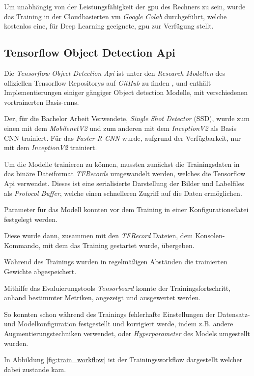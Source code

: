 Um unabhängig von der Leistungsfähigkeit der \Gls{gpu} des 
Rechners zu sein, wurde das Training in der Cloudbasierten
\Gls{vm} \textit{Google Colab} \cite{colab} durchgeführt,
welche kostenlos eine, für Deep Learning geeignete, \Gls{gpu}
zur Verfügung stellt.



\subsection{Tensorflow Object Detection Api}

Die \textit{Tensorflow Object Detection Api} ist unter den
\textit{Research Modellen} des offiziellen Tensorflow
Repositorys auf \textit{GitHub} zu finden \cite{tfobjdet},
und enthält Implementierungen
einiger gängiger Object detection Modelle, mit verschiedenen 
vortrainerten Basis-\Glspl{cnn}.

Der, für die Bachelor Arbeit Verwendete, \textit{Single 
Shot Detector} (SSD), wurde zum einen mit dem 
\textit{MobilenetV2} und zum anderen mit dem 
\textit{InceptionV2} als Basis CNN trainiert.
Für das \textit{Faster R-CNN} wurde, aufgrund 
der Verfügbarkeit, nur mit dem \textit{InceptionV2}
trainiert.

Um die Modelle trainieren zu können, mussten zunächst die 
Trainingsdaten in das binäre Dateiformat \textit{TFRecords} 
umgewandelt werden, welches die Tensorflow Api verwendet.
Dieses ist eine serialisierte 
Darstellung der Bilder und Labelfiles als \textit{Protocol Buffer},
welche einen schnelleren Zugriff auf die Daten ermöglichen.

Parameter für das Modell konnten vor dem Training 
in einer Konfigurationsdatei festgelegt werden.

Diese wurde dann, zusammen mit den \textit{TFRecord} Dateien, 
dem Konsolen-Kommando, mit dem das Training 
gestartet wurde, übergeben.

Während des Trainings wurden in regelmäßigen 
Abständen die trainierten Gewichte abgespeichert.

Mithilfe das Evaluierungstools \textit{Tensorboard}
konnte der Trainingsfortschritt, anhand bestimmter
Metriken, angezeigt und ausgewertet werden.

So konnten schon während des Trainings fehlerhafte
Einstellungen der Datensatz- und 
Modelkonfiguration festgestellt 
und korrigiert werde, indem z.B. andere
Augmentierungstechniken verwendet,
oder \textit{Hyperparameter} des
Models umgestellt wurden.

In Abbildung \ref{fig:train_workflow}
ist der Trainingsworkflow dargestellt 
welcher dabei zustande kam.

